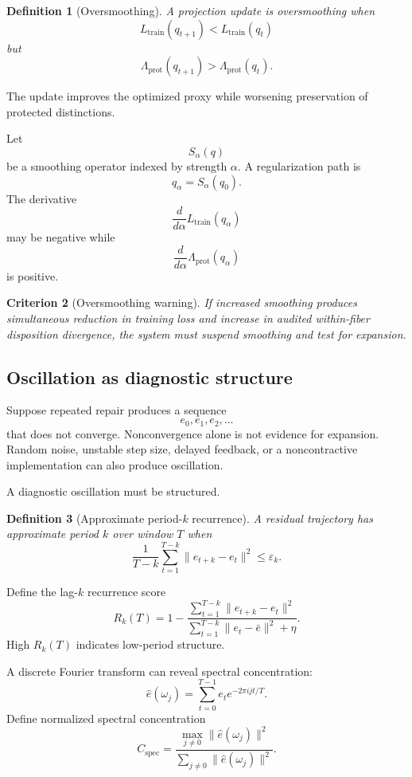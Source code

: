 \documentclass[11pt]{article}
\newtheorem{definition}{Definition}[section]
\newtheorem{criterion}[definition]{Criterion}
\theoremstyle{definition}
\newcommand{\eps}{\varepsilon}
\begin{document}
\begin{definition}[Oversmoothing]
A projection update is oversmoothing when
\[
L_{\mathrm{train}}(q_{t+1})
<
L_{\mathrm{train}}(q_t)
\]
but
\[
\Lambda_{\mathrm{prot}}(q_{t+1})
>
\Lambda_{\mathrm{prot}}(q_t).
\]
\end{definition}

The update improves the optimized proxy while worsening preservation of protected distinctions.

Let
\[
S_\alpha(q)
\]
be a smoothing operator indexed by strength \(\alpha\). A regularization path is
\[
q_\alpha=S_\alpha(q_0).
\]
The derivative
\[
\frac{d}{d\alpha}
L_{\mathrm{train}}(q_\alpha)
\]
may be negative while
\[
\frac{d}{d\alpha}
\Lambda_{\mathrm{prot}}(q_\alpha)
\]
is positive.

\begin{criterion}[Oversmoothing warning]
If increased smoothing produces simultaneous reduction in training loss and increase in audited within-fiber disposition divergence, the system must suspend smoothing and test for expansion.
\end{criterion}

\subsection{Oscillation as diagnostic structure}

Suppose repeated repair produces a sequence
\[
e_0,e_1,e_2,\ldots
\]
that does not converge. Nonconvergence alone is not evidence for expansion. Random noise, unstable step size, delayed feedback, or a noncontractive implementation can also produce oscillation.

A diagnostic oscillation must be structured.

\begin{definition}[Approximate period-\(k\) recurrence]
A residual trajectory has approximate period \(k\) over window \(T\) when
\[
\frac{1}{T-k}
\sum_{t=1}^{T-k}
\|e_{t+k}-e_t\|^2
\leq
\eps_k.
\]
\end{definition}

Define the lag-\(k\) recurrence score
\[
R_k(T)
=
1-
\frac{
\sum_{t=1}^{T-k}
\|e_{t+k}-e_t\|^2
}{
\sum_{t=1}^{T-k}
\|e_t-\bar e\|^2+\eta
}.
\]
High \(R_k(T)\) indicates low-period structure.

A discrete Fourier transform can reveal spectral concentration:
\[
\widehat e(\omega_j)
=
\sum_{t=0}^{T-1}
e_t
e^{-2\pi ijt/T}.
\]
Define normalized spectral concentration
\[
C_{\mathrm{spec}}
=
\frac{
\max_{j\neq0}
\|\widehat e(\omega_j)\|^2
}{
\sum_{j\neq0}
\|\widehat e(\omega_j)\|^2
}.
\]
\end{document}
